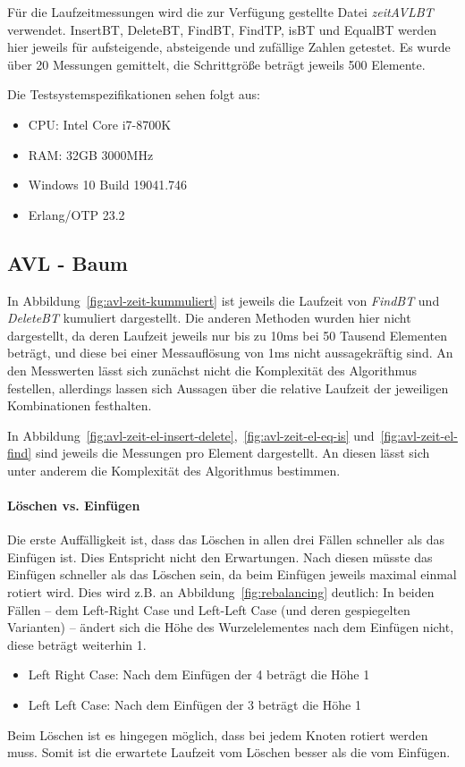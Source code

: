 Für die Laufzeitmessungen wird die zur Verfügung gestellte Datei \textit{zeitAVLBT} verwendet.
InsertBT, DeleteBT, FindBT, FindTP, isBT und EqualBT werden hier jeweils für aufsteigende,
absteigende und zufällige Zahlen getestet.
Es wurde über 20 Messungen gemittelt, die Schrittgröße beträgt jeweils 500 Elemente.

Die Testsystemspezifikationen sehen folgt aus:
\begin{itemize}
    \item CPU: Intel Core i7-8700K
    \item RAM: 32GB 3000MHz
    \item Windows 10 Build 19041.746
    \item Erlang/OTP 23.2
\end{itemize}

\subsection{AVL - Baum}\label{subsec:laufzeitmessung-avl}

In Abbildung~\ref{fig:avl-zeit-kummuliert} ist jeweils die Laufzeit von \textit{FindBT} und
\textit{DeleteBT} kumuliert dargestellt.
Die anderen Methoden wurden hier nicht dargestellt, da deren Laufzeit jeweils nur bis zu 10ms bei
50 Tausend Elementen beträgt, und diese bei einer Messauflösung von 1ms nicht aussagekräftig
sind.
An den Messwerten lässt sich zunächst nicht die Komplexität des Algorithmus festellen,
allerdings lassen sich Aussagen über die relative Laufzeit der jeweiligen Kombinationen festhalten.

In Abbildung~\ref{fig:avl-zeit-el-insert-delete},~\ref{fig:avl-zeit-el-eq-is}
und~\ref{fig:avl-zeit-el-find} sind jeweils die Messungen pro Element dargestellt.
An diesen lässt sich unter anderem die Komplexität des Algorithmus bestimmen.

\paragraph{Löschen vs. Einfügen}
Die erste Auffälligkeit ist, dass das Löschen in allen drei Fällen schneller als das Einfügen ist.
Dies Entspricht nicht den Erwartungen.
Nach diesen müsste das Einfügen schneller als das Löschen sein, da beim Einfügen jeweils maximal
einmal rotiert wird.
Dies wird z.B. an Abbildung~\ref{fig:rebalancing} deutlich:
In beiden Fällen -- dem Left-Right Case und Left-Left Case (und deren gespiegelten Varianten) --
ändert sich die Höhe des Wurzelelementes nach dem Einfügen nicht, diese beträgt weiterhin 1.
\begin{itemize}
    \item Left Right Case: Nach dem Einfügen der 4 beträgt die Höhe 1
    \item Left Left Case: Nach dem Einfügen der 3 beträgt die Höhe 1
\end{itemize}
Beim Löschen ist es hingegen möglich, dass bei jedem Knoten rotiert werden muss.
Somit ist die erwartete Laufzeit vom Löschen besser als die vom Einfügen.

